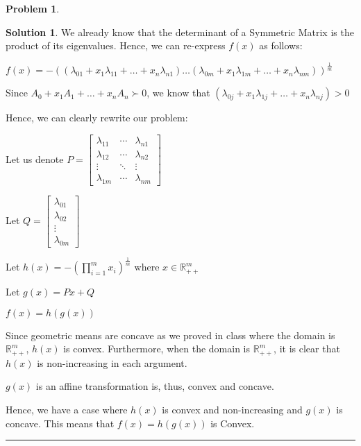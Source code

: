 \documentclass{article}
\theoremstyle{definition}
\newtheorem{problem}{Problem}
\def\fline{\rule{0.75\linewidth}{0.5pt}}
\newcommand{\finishline}{\begin{center}\fline\end{center}}
\newtheorem*{solution*}{Solution}
\newenvironment{solution}{\begin{solution*}}{{\finishline} \end{solution*}}
\begin{document}
\begin{problem}
\begin{itemize}
\begin{solution}
        We already know that the determinant of a Symmetric Matrix is the product of its eigenvalues. Hence, we can re-express $f(x)$ as follows: \newline 

        $f(x) = - ((\lambda_{01} + x_1 \lambda_{11} + \dots + x_n \lambda_{n1}) \dots (\lambda_{0m} + x_1 \lambda_{1m} + \dots + x_n \lambda_{nm}))^{\frac{1}{m}}$

        Since $A_0 + x_1 A_1 + \dots + x_n A_n \succ 0$, we know that $(\lambda_{0j} + x_1 \lambda_{1j} + \dots + x_n \lambda_{nj}) > 0$

Hence, we can clearly rewrite our problem: \newline 

        Let us denote $P = \begin{bmatrix}
    \lambda_{11} & \cdots & \lambda_{n1} \\
    \lambda_{12} & \cdots & \lambda_{n2} \\
    \vdots & \ddots & \vdots \\
    \lambda_{1m} & \cdots & \lambda_{nm}
\end{bmatrix}$

Let $Q = \begin{bmatrix}
    \lambda_{01} \\
    \lambda_{02} \\
    \vdots \\
    \lambda_{0m}
\end{bmatrix}$

Let $h(x) = - (\prod_{i=1}^{m} x_i)^{\frac{1}{m}}$ where $x \in \mathbb{R}^m_{++}$ \newline 

Let $g(x) = Px + Q$

$f(x) = h(g(x))$ \newline 

Since geometric means are concave as we proved in class where the domain is $\mathbb{R}^m_{++}$, $h(x)$ is convex. Furthermore, when the domain is $\mathbb{R}^m_{++}$, it is clear that $h(x)$ is non-increasing in each argument. 

$g(x)$ is an affine transformation is, thus, convex and concave. 
        
Hence, we have a case where $h(x)$ is convex and non-increasing and $g(x)$ is concave. This means that $f(x) = h(g(x))$ is Convex. 
    \end{solution}
\end{itemize}
\end{problem}
\end{document}
